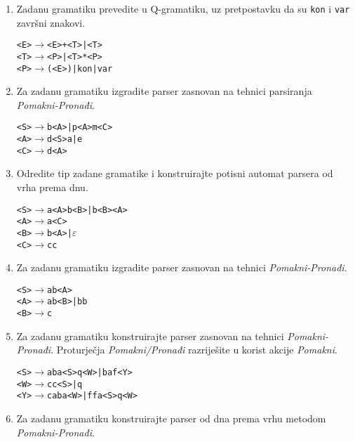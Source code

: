 \documentclass[times, 12pt, utf8]{book}
\begin{document}
\begin{enumerate}[resume]
\item 
Zadanu gramatiku prevedite u Q-gramatiku, uz pretpostavku da su \texttt{kon} i \texttt{var} završni znakovi. \cite[str.~91-98]{udzbenik}

\begin{alltt}
<E> \(\to\) <E>+<T> | <T>
<T> \(\to\) <P> | <T>*<P>
<P> \(\to\) (<E>) | kon | var
\end{alltt} 

\item
Za zadanu gramatiku izgradite parser zasnovan na tehnici parsiranja \emph{Pomakni-Pronađi}. \cite[str.~121-123]{udzbenik}

\begin{alltt}
<S> \(\to\) b<A> | p<A>m<C>
<A> \(\to\) d<S>a | e
<C> \(\to\) d<A>
\end{alltt} 

\item
Odredite tip zadane gramatike i konstruirajte potisni automat parsera od vrha prema dnu.  \cite[str.~84-100]{udzbenik}

\begin{alltt}
<S> \(\to\) a<A>b<B> | b<B><A>
<A> \(\to\) a<C>
<B> \(\to\) b<A> | \(\varepsilon\)
<C> \(\to\) cc
\end{alltt}

\item
Za zadanu gramatiku izgradite parser zasnovan na tehnici \emph{Pomakni-Pronađi}. \cite[str.~121-123]{udzbenik} \cite{auditorne}

\begin{alltt}
<S> \(\to\) ab<A>
<A> \(\to\) ab<B> | bb
<B> \(\to\) c
\end{alltt} 

\item
Za zadanu gramatiku konstruirajte parser zasnovan na tehnici \emph{Pomakni-Pronađi}.
Proturječja \emph{Pomakni/Pronađi} razriješite u korist akcije \emph{Pomakni}.
 \cite[str.~121-123]{udzbenik} \cite{auditorne}

\begin{alltt}
<S> \(\to\) aba<S>q<W> | baf<Y>
<W> \(\to\) cc<S> | q
<Y> \(\to\) caba<W> | ffa<S>q<W>
\end{alltt} 

\item 
Za zadanu gramatiku konstruirajte parser od dna prema vrhu metodom \emph{Pomakni-Pronađi}. \cite[str.~121-123]{udzbenik} \cite{auditorne}


\end{enumerate}
\end{document}
